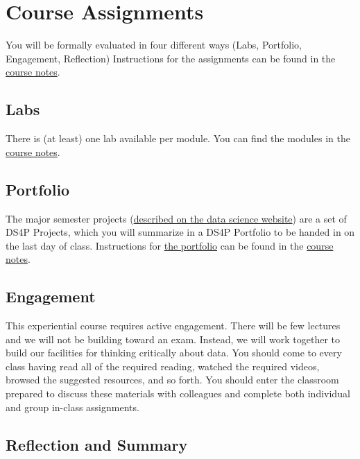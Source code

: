 \documentclass[
]{book}
\begin{document}
\section*{Course Assignments}\label{course-assignments-5}


You will be formally evaluated in four different ways (Labs, Portfolio, Engagement, Reflection) Instructions for the assignments can be found in the \href{https://datascience4psych.github.io/DataScience4Psych/}{course notes}.

\subsection*{Labs}\label{labs-1}


There is (at least) one lab available per module. You can find the modules in the \href{https://datascience4psych.github.io/DataScience4Psych/}{course notes}.

\subsection*{Portfolio}\label{portfolio-1}


The major semester projects (\href{https://datascience4psych.github.io/DataScience4Psych/guidance.html\#portfolio}{described on the data science website}) are a set of DS4P Projects, which you will summarize in a DS4P Portfolio to be handed in on the last day of class. Instructions for \href{https://datascience4psych.github.io/DataScience4Psych/guidance.html\#portfolio}{the portfolio} can be found in the \href{https://datascience4psych.github.io/DataScience4Psych/}{course notes}.

\subsection*{Engagement}\label{engagement-1}


This experiential course requires active engagement. There will be few lectures and we will not be building toward an exam. Instead, we will work together to build our facilities for thinking critically about data. You should come to every class having read all of the required reading, watched the required videos, browsed the suggested resources, and so forth. You should enter the classroom prepared to discuss these materials with colleagues and complete both individual and group in-class assignments.

\subsection*{Reflection and Summary}\label{reflection-and-summary-1}
\end{document}
